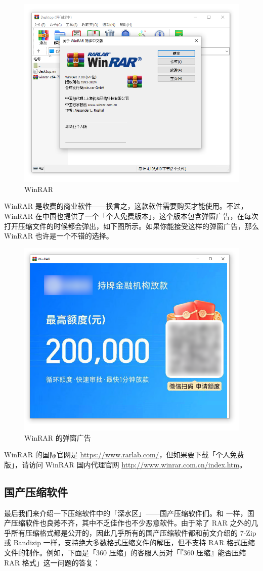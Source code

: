 {{{{\begin{figure}[htb!]
  \centering
  \includegraphics[width=.7\textwidth]{assets/software/WinRAR_main_window.png}
  \caption{WinRAR}
  \label{fig:WinRAR_main_window}
\end{figure}

WinRAR 是收费的商业软件——换言之，这款软件需要购买才能使用。不过，WinRAR 在中国也提供了一个「个人免费版本」，这个版本包含弹窗广告，在每次打开压缩文件的时候都会弹出，如下图所示。如果你能接受这样的弹窗广告，那么 WinRAR 也许是一个不错的选择。

\begin{figure}[htb!]
  \centering
  \includegraphics[width=.5\textwidth]{assets/software/WinRAR_ad.png}
  \caption{WinRAR 的弹窗广告}
  \label{fig:WinRAR_ad}
\end{figure}

WinRAR 的国际官网是 \url{https://www.rarlab.com/}，但如果要下载「个人免费版」，请访问 WinRAR 国内代理官网 \url{http://www.winrar.com.cn/index.htm}。

\subsection{国产压缩软件}

最后我们来介绍一下压缩软件中的「深水区」——国产压缩软件们。和 一样，国产压缩软件也良莠不齐，其中不乏佳作也不少恶意软件。由于除了 RAR 之外的几乎所有压缩格式都是公开的，因此几乎所有的国产压缩软件都和前文介绍的 7-Zip 或 Bandizip 一样，支持绝大多数格式压缩文件的解压，但不支持 RAR 格式压缩文件的制作。例如，下面是「360 压缩」的客服人员对「『360 压缩』能否压缩 RAR 格式」这一问题的答复：

}}}}

